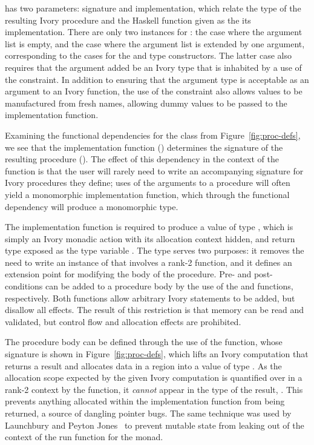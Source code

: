  has two parameters: signature and implementation, which relate
the  type of the resulting Ivory procedure and the Haskell function
given as the its implementation.  There are only two instances for
: the case where the argument list is empty, and the case where
the argument list is extended by one argument, corresponding to the cases for
the  and  type constructors.  The latter case also requires
that the argument added be an Ivory type that is inhabited by a use of the
 constraint.  In addition to ensuring that the argument type is
acceptable as an argument to an Ivory function, the use of the 
constraint also allows values to be manufactured from fresh names, allowing
dummy values to be passed to the implementation function.

Examining the functional dependencies for the  class from
Figure~\ref{fig:proc-defs}, we see that the implementation function ()
determines the signature of the resulting procedure ().  The effect of
this dependency in the context of the  function is that the user will
rarely need to write an accompanying  signature for Ivory procedures
they define; uses of the arguments to a procedure will often yield a monomorphic
implementation function, which through the functional dependency will produce a
monomorphic  type.

The implementation function is required to produce a value of type ,
which is simply an Ivory monadic action with its allocation context hidden, and
return type exposed as the type variable .  The  type serves two
purposes: it removes the need to write an instance of  that
involves a rank-2 function, and it defines an extension point for modifying the
body of the procedure.  Pre- and post-conditions can be added to a procedure body
by the use of the  and  functions, respectively.  Both
functions allow arbitrary Ivory statements to be added, but disallow all
effects.  The result of this restriction is that memory can be read and
validated, but control flow and allocation effects are prohibited.

The procedure body can be defined through the use of the  function,
whose signature is shown in Figure~\ref{fig:proc-defs}, which lifts an Ivory
computation that returns a result  and allocates data in a region 
into a value of type .  As the allocation scope expected by the given
Ivory computation is quantified over in a rank-2 context by the  function,
it \emph{cannot} appear in the type of the result, .  This
prevents anything allocated within the implementation function from
being returned, a source of dangling pointer bugs.  The same technique was
used by Launchbury and Peyton Jones~\cite{stmonad} to prevent mutable state
from leaking out of the context of the run function for the  monad.

